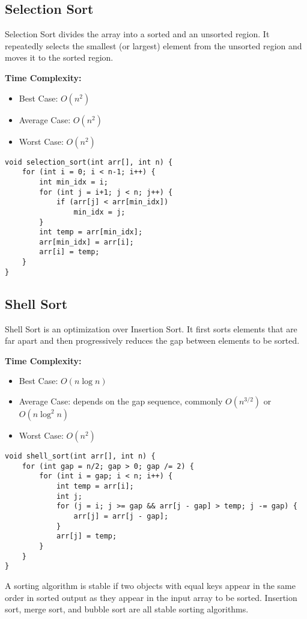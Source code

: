 \subsection{Selection Sort}
Selection Sort divides the array into a sorted and an unsorted 
region. It repeatedly selects the smallest (or largest) element 
from the unsorted region and moves it to the sorted region.

\textbf{Time Complexity:}
\begin{itemize}
    \item Best Case: $O(n^2)$
    \item Average Case: $O(n^2)$
    \item Worst Case: $O(n^2)$
\end{itemize}

\begin{lstlisting}[caption=Selection Sort]
void selection_sort(int arr[], int n) {
    for (int i = 0; i < n-1; i++) {
        int min_idx = i;
        for (int j = i+1; j < n; j++) {
            if (arr[j] < arr[min_idx])
                min_idx = j;
        }
        int temp = arr[min_idx];
        arr[min_idx] = arr[i];
        arr[i] = temp;
    }
}
\end{lstlisting}
\subsection{Shell Sort}
Shell Sort is an optimization over Insertion Sort. 
It first sorts elements that are far apart and then progressively 
reduces the gap between elements to be sorted.

\textbf{Time Complexity:}
\begin{itemize}
    \item Best Case: $O(n \log n)$
    \item Average Case: depends on the gap sequence, commonly $O(n^{3/2})$ or $O(n \log^2 n)$
    \item Worst Case: $O(n^2)$
\end{itemize}

\begin{lstlisting}[caption=Shell Sort]
void shell_sort(int arr[], int n) {
    for (int gap = n/2; gap > 0; gap /= 2) {
        for (int i = gap; i < n; i++) {
            int temp = arr[i];
            int j;
            for (j = i; j >= gap && arr[j - gap] > temp; j -= gap) {
                arr[j] = arr[j - gap];
            }
            arr[j] = temp;
        }
    }
}
\end{lstlisting}

A sorting algorithm is stable if two objects with equal keys 
appear in the same order in sorted output as they appear in 
the input array to be sorted. Insertion sort, merge sort, and 
bubble sort are all stable sorting algorithms. 